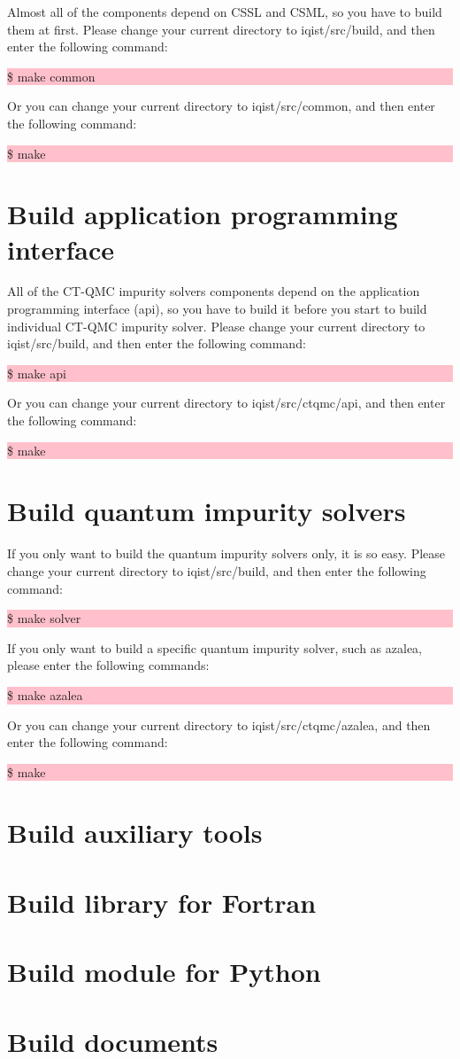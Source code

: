 Almost all of the components depend on CSSL and CSML, so you have to build them at first. Please change your current directory to iqist/src/build, and then enter the following command:

\noindent\colorbox{pink}{\parbox[r]{\linewidth}{\quad \$ make common}}

Or you can change your current directory to iqist/src/common, and then enter the following command:

\noindent\colorbox{pink}{\parbox[r]{\linewidth}{\quad \$ make}}

\section{Build application programming interface}

All of the CT-QMC impurity solvers components depend on the application programming interface (api), so you have to build it before you start to build individual CT-QMC impurity solver. Please change your current directory to iqist/src/build, and then enter the following command:

\noindent\colorbox{pink}{\parbox[r]{\linewidth}{\quad \$ make api}}

Or you can change your current directory to iqist/src/ctqmc/api, and then enter the following command:

\noindent\colorbox{pink}{\parbox[r]{\linewidth}{\quad \$ make}}

\section{Build quantum impurity solvers}

If you only want to build the quantum impurity solvers only, it is so easy. Please change your current directory to iqist/src/build, and then enter the following command:

\noindent\colorbox{pink}{\parbox[r]{\linewidth}{\quad \$ make solver}}

If you only want to build a specific quantum impurity solver, such as azalea, please enter the following commands:

\noindent\colorbox{pink}{\parbox[r]{\linewidth}{\quad \$ make azalea}}

Or you can change your current directory to iqist/src/ctqmc/azalea, and then enter the following command:

\noindent\colorbox{pink}{\parbox[r]{\linewidth}{\quad \$ make}}


\section{Build auxiliary tools}
\section{Build library for Fortran}
\section{Build module for Python}
\section{Build documents}
